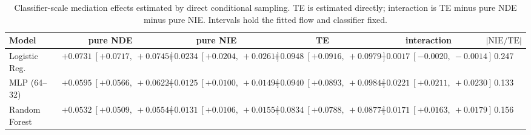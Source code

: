 \begin{table}[htbp]
  \centering
  \caption{Classifier-scale mediation effects estimated by direct conditional sampling. TE is estimated directly; interaction is TE minus pure NDE minus pure NIE. Intervals hold the fitted flow and classifier fixed.}
  \label{tab:acs_gap_overall}
  \begin{tabular}{lccccc}
    \toprule
    Model & pure NDE & pure NIE & TE & interaction & $|\mathrm{NIE}/\mathrm{TE}|$ \\
    \midrule
    Logistic Reg. & $+0.0731\ [+0.0717,\ +0.0745]$ & $+0.0234\ [+0.0204,\ +0.0261]$ & $+0.0948\ [+0.0916,\ +0.0979]$ & $-0.0017\ [-0.0020,\ -0.0014]$ & 0.247 \\
    MLP (64--32) & $+0.0595\ [+0.0566,\ +0.0622]$ & $+0.0125\ [+0.0100,\ +0.0149]$ & $+0.0940\ [+0.0893,\ +0.0984]$ & $+0.0221\ [+0.0211,\ +0.0230]$ & 0.133 \\
    Random Forest & $+0.0532\ [+0.0509,\ +0.0554]$ & $+0.0131\ [+0.0106,\ +0.0155]$ & $+0.0834\ [+0.0788,\ +0.0877]$ & $+0.0171\ [+0.0163,\ +0.0179]$ & 0.156 \\
    \bottomrule
  \end{tabular}
\end{table}